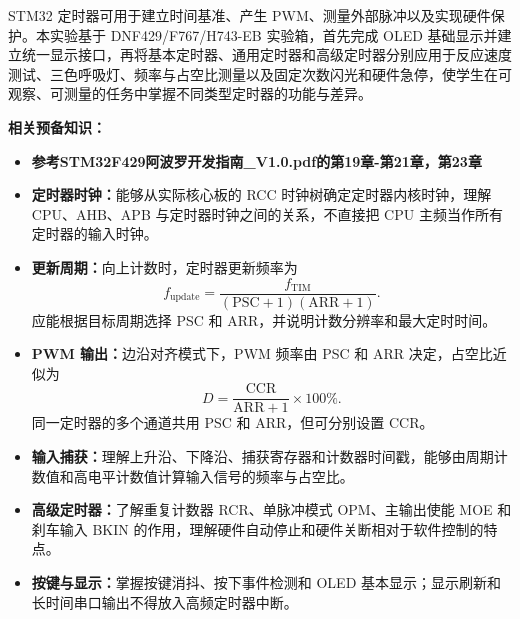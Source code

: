\documentclass[UTF8,zihao=5,fontset=fandol]{ctexart}
\begin{document}
\begin{reportsection}{\PurposeTitle}{}
  STM32 定时器可用于建立时间基准、产生 PWM、测量外部脉冲以及实现硬件保护。本实验基于 DNF429/F767/H743-EB 实验箱，首先完成 OLED 基础显示并建立统一显示接口，再将基本定时器、通用定时器和高级定时器分别应用于反应速度测试、三色呼吸灯、频率与占空比测量以及固定次数闪光和硬件急停，使学生在可观察、可测量的任务中掌握不同类型定时器的功能与差异。

  \textbf{相关预备知识：}
  \begin{itemize}
    \item \textbf{参考STM32F429阿波罗开发指南_V1.0.pdf的第19章-第21章，第23章}
    \item \textbf{定时器时钟：}能够从实际核心板的 RCC 时钟树确定定时器内核时钟，理解 CPU、AHB、APB 与定时器时钟之间的关系，不直接把 CPU 主频当作所有定时器的输入时钟。
    \item \textbf{更新周期：}向上计数时，定时器更新频率为
    \[
      f_{\mathrm{update}}
      =\frac{f_{\mathrm{TIM}}}{(\mathrm{PSC}+1)(\mathrm{ARR}+1)}.
    \]
    应能根据目标周期选择 PSC 和 ARR，并说明计数分辨率和最大定时时间。
    \item \textbf{PWM 输出：}边沿对齐模式下，PWM 频率由 PSC 和 ARR 决定，占空比近似为
    \[
      D=\frac{\mathrm{CCR}}{\mathrm{ARR}+1}\times 100\%.
    \]
    同一定时器的多个通道共用 PSC 和 ARR，但可分别设置 CCR。
    \item \textbf{输入捕获：}理解上升沿、下降沿、捕获寄存器和计数器时间戳，能够由周期计数值和高电平计数值计算输入信号的频率与占空比。
    \item \textbf{高级定时器：}了解重复计数器 RCR、单脉冲模式 OPM、主输出使能 MOE 和刹车输入 BKIN 的作用，理解硬件自动停止和硬件关断相对于软件控制的特点。
    \item \textbf{按键与显示：}掌握按键消抖、按下事件检测和 OLED 基本显示；显示刷新和长时间串口输出不得放入高频定时器中断。
  \end{itemize}


\end{reportsection}
\end{document}
